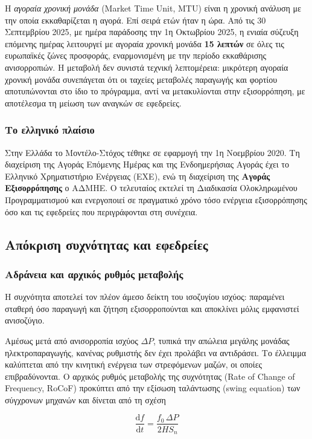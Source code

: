 Η \emph{αγοραία χρονική μονάδα} (Market Time Unit, MTU) είναι η χρονική ανάλυση με την
οποία εκκαθαρίζεται η αγορά. Επί σειρά ετών ήταν η ώρα. Από τις 30 Σεπτεμβρίου 2025, με ημέρα παράδοσης την 1η
Οκτωβρίου 2025, η ενιαία σύζευξη επόμενης ημέρας λειτουργεί με αγοραία χρονική μονάδα
\textbf{15 λεπτών} σε όλες τις ευρωπαϊκές ζώνες προσφοράς, εναρμονισμένη με την περίοδο
εκκαθάρισης ανισορροπιών. Η μεταβολή δεν συνιστά τεχνική λεπτομέρεια: μικρότερη αγοραία
χρονική μονάδα συνεπάγεται ότι οι ταχείες μεταβολές παραγωγής και φορτίου αποτυπώνονται στο ίδιο
το πρόγραμμα, αντί να μετακυλίονται στην εξισορρόπηση, με αποτέλεσμα τη μείωση των αναγκών
σε εφεδρείες.

\subsubsection*{Το ελληνικό πλαίσιο}

Στην Ελλάδα το Μοντέλο-Στόχος τέθηκε σε εφαρμογή την 1η Νοεμβρίου 2020. Τη διαχείριση της
Αγοράς Επόμενης Ημέρας και της Ενδοημερήσιας Αγοράς έχει το Ελληνικό Χρηματιστήριο Ενέργειας
(ΕΧΕ), ενώ τη διαχείριση της \textbf{Αγοράς Εξισορρόπησης} ο ΑΔΜΗΕ. Ο τελευταίος εκτελεί τη Διαδικασία
Ολοκληρωμένου Προγραμματισμού και ενεργοποιεί σε πραγματικό χρόνο τόσο ενέργεια
εξισορρόπησης όσο και τις εφεδρείες που περιγράφονται στη συνέχεια.

\subsection{Απόκριση συχνότητας και εφεδρείες}

\subsubsection*{Αδράνεια και αρχικός ρυθμός μεταβολής}

Η συχνότητα αποτελεί τον πλέον άμεσο δείκτη του ισοζυγίου ισχύος: παραμένει σταθερή όσο
παραγωγή και ζήτηση εξισορροπούνται και αποκλίνει μόλις εμφανιστεί ανισοζύγιο.

Αμέσως μετά από ανισορροπία ισχύος $\Delta P$, τυπικά την απώλεια μεγάλης μονάδας
ηλεκτροπαραγωγής, κανένας
ρυθμιστής δεν έχει προλάβει να αντιδράσει. Το έλλειμμα καλύπτεται από την κινητική ενέργεια
των στρεφόμενων μαζών, οι οποίες επιβραδύνονται. Ο αρχικός ρυθμός μεταβολής της συχνότητας
(Rate of Change of Frequency, RoCoF) προκύπτει από την εξίσωση ταλάντωσης (swing equation)
των σύγχρονων μηχανών και δίνεται από τη σχέση

\begin{equation}
\frac{\mathrm{d}f}{\mathrm{d}t} = \frac{f_0 \, \Delta P}{2 H S_n}
\label{eq:rocof}
\end{equation}

